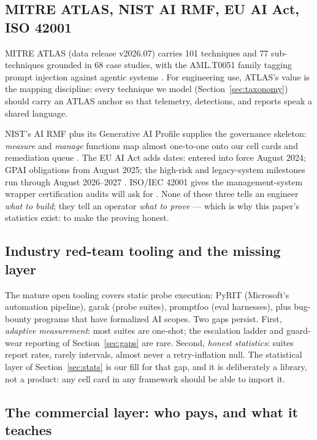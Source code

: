 \subsection{MITRE ATLAS, NIST AI RMF, EU AI Act, ISO 42001}\label{sec:standards-map}

MITRE ATLAS (data release v2026.07) carries 101 techniques and 77
sub-techniques grounded in 68 case studies, with the AML.T0051 family
tagging prompt injection against agentic systems \cite{atlas}. For engineering use, ATLAS's value is the mapping discipline:
every technique we model (Section~\ref{sec:taxonomy}) should carry an ATLAS
anchor so that telemetry, detections, and reports speak a shared language.

NIST's AI RMF plus its Generative AI Profile supplies the governance skeleton:
\emph{measure} and \emph{manage} functions map almost one-to-one onto our cell
cards and remediation queue \cite{nist-ai-rmf,nist-genai}. The EU AI Act adds
dates: entered into force August 2024; GPAI obligations from August 2025; the
high-risk and legacy-system milestones run through August 2026--2027
\cite{eu-ai-act}. ISO/IEC 42001 gives the management-system wrapper
certification audits will ask for \cite{iso42001}. None of these three tells an
engineer \emph{what to build}; they tell an operator \emph{what to prove} ---
which is why this paper's statistics exist: to make the proving honest.

\subsection{Industry red-team tooling and the missing layer}\label{sec:tooling}

The mature open tooling covers static probe execution: PyRIT (Microsoft's
automation pipeline), garak (probe suites), promptfoo (eval harnesses), plus
bug-bounty programs that have formalized AI scopes. Two gaps persist. First,
\emph{adaptive measurement}: most suites are one-shot; the escalation ladder and
guard-wear reporting of Section~\ref{sec:gaps} are rare. Second,
\emph{honest statistics}: suites report rates, rarely intervals, almost never a
retry-inflation null. The statistical layer of Section~\ref{sec:stats} is our
fill for that gap, and it is deliberately a library, not a product: any cell
card in any framework should be able to import it.

\subsection{The commercial layer: who pays, and what it teaches}\label{sec:money}

